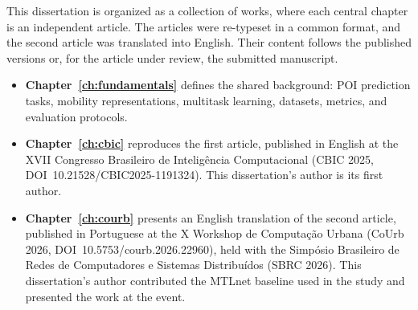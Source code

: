 This dissertation is organized as a collection of works, where each central chapter is an
independent article. The articles were re-typeset in a common format, and the second
article was translated into English. Their content follows the published versions or,
for the article under review, the submitted manuscript.
\begin{itemize}
    \item \textbf{Chapter~\ref{ch:fundamentals}} defines the shared background: POI
    prediction tasks, mobility representations, multitask learning, datasets,
    metrics, and evaluation protocols.
    \item \textbf{Chapter~\ref{ch:cbic}} reproduces the first article, published in
    English at the XVII Congresso Brasileiro de Intelig\^encia Computacional
    (CBIC 2025, DOI~10.21528/CBIC2025-1191324). This dissertation's author is its
    first author.
    \item \textbf{Chapter~\ref{ch:courb}} presents an English translation of the second
    article, published in Portuguese at the X Workshop de Computa\c{c}\~ao Urbana
    (CoUrb 2026, DOI~10.5753/courb.2026.22960), held with the Simp\'osio
    Brasileiro de Redes de Computadores e Sistemas Distribu\'idos (SBRC 2026).
    This dissertation's author contributed the MTLnet baseline used in the study
    and presented the work at the event.

\end{itemize}
